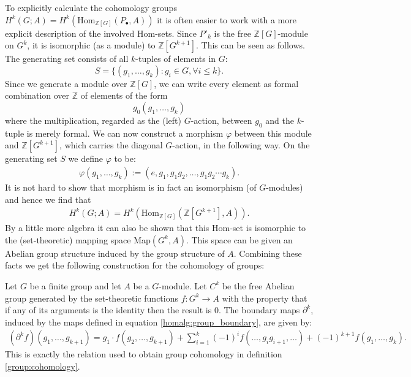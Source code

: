 	To explicitly calculate the cohomology groups $H^k(G; A) = H^k(\text{Hom}_{\mathbb{Z}[G]}(P_\bullet, A))$ it is often easier to work with a more explicit description of the involved Hom-sets. Since $P'_k$ is the free $\mathbb{Z}[G]$-module on $G^k$, it is isomorphic (as a module) to $\mathbb{Z}[G^{k+1}]$. This can be seen as follows. The generating set consists of all $k$-tuples of elements in $G$: \[S = \{(g_1, \ldots, g_k): g_i\in G, \forall i\leq k\}.\] Since we generate a module over $\mathbb{Z}[G]$, we can write every element as formal combination over $\mathbb{Z}$ of elements of the form \[g_0(g_1, \ldots, g_k)\] where the multiplication, regarded as the (left) $G$-action, between $g_0$ and the $k$-tuple is merely formal. We can now construct a morphism $\varphi$ between this module and $\mathbb{Z}[G^{k+1}]$, which carries the diagonal $G$-action, in the following way. On the generating set $S$ we define $\varphi$ to be:
	\begin{gather}
		\varphi(g_1, \ldots, g_k) := (e, g_1, g_1g_2, \ldots, g_1g_2\cdots g_k).
	\end{gather}
	It is not hard to show that morphism is in fact an isomorphism (of $G$-modules) and hence we find that
	\begin{gather}
		H^k(G; A) = H^k(\text{Hom}_{\mathbb{Z}[G]}(\mathbb{Z}[G^{k+1}], A)).
	\end{gather}
	By a little more algebra it can also be shown that this Hom-set is isomorphic to the (set-theoretic) mapping space Map$(G^k, A)$. This space can be given an Abelian group structure induced by the group structure of $A$. Combining these facts we get the following construction for the cohomology of groups:
	\begin{construct}
		Let $G$ be a finite group and let $A$ be a $G$-module. Let $C^k$ be the free Abelian group generated by the set-theoretic functions $f:G^k\rightarrow A$ with the property that if any of its arguments is the identity then the result is 0. The boundary maps $\partial^k$, induced by the maps defined in equation \ref{homalg:group_boundary}, are given by:
		\begin{gather}
			(\partial^k f)(g_1, \ldots, g_{k+1}) = g_1\cdot f(g_2, \ldots, g_{k+1}) + \sum_{i=1}^k(-1)^if(\ldots, g_ig_{i+1}, \ldots) + (-1)^{k+1}f(g_1, \ldots, g_k).
		\end{gather}
		This is exactly the relation used to obtain group cohomology in definition \ref{group:cohomology}.
	\end{construct}

